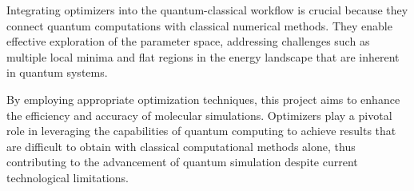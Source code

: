 Integrating optimizers into the quantum-classical workflow is crucial because they connect quantum computations with classical numerical methods. They enable effective exploration of the parameter space, addressing challenges such as multiple local minima and flat regions in the energy landscape that are inherent in quantum systems.

By employing appropriate optimization techniques, this project aims to enhance the efficiency and accuracy of molecular simulations. Optimizers play a pivotal role in leveraging the capabilities of quantum computing to achieve results that are difficult to obtain with classical computational methods alone, thus contributing to the advancement of quantum simulation despite current technological limitations.





